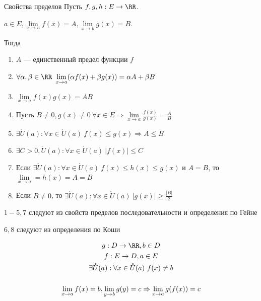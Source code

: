 \begin{thrm}{Свойства пределов}{}
    Пусть \( f, g, h : E \to \RR \).

    \( a \in E, \lim\limits_{x \to a} f(x) = A, \lim\limits_{x \to b} g(x) = B \).

    Тогда
    \begin{enumerate}
        \item
            \( A \) --- единственный предел функции \( f \)
        \item
            \( \forall \alpha, \beta \in \RR \ \lim\limits_{x \to a} (\alpha f(x) + \beta g(x)) = \alpha A + \beta B \)
        \item
            \( \lim\limits_{x \to a} f(x)g(x) = AB \)
        \item
            Пусть 
            \( 
                B \neq 0, g(x) \neq 0 \ \forall x \in E \Rightarrow \lim\limits_{x \to a} \frac{f(x)}{g(x)} = \frac{A}{B} 
            \)
        \item
            \( \exists \mathring{U} (a) : \forall x \in \mathring{U}(a) \ f(x) \leq g(x) \Rightarrow A \leq B \)
        \item
            \( \exists C > 0, \mathring{U}(a) : \forall x \in \mathring{U}(a) \ |f(x)| \leq C \)
        \item
            Если \( \exists \mathring{U}(a) : \forall x \in \mathring{U}(a) \ f(x) \leq h(x) \leq g(x) \)
            и \( A = B \), то \( \lim\limits_{x \to a} = h(x) = A = B \)
        \item
            Если \( B \neq 0 \), то \( \exists \mathring{U}(a) : \forall x \in \mathring{U}(a) \ |g(x)| \geq \frac{|B|}{2} \)
    \end{enumerate}
\end{thrm}

\( 1-5, 7 \) следуют из свойств пределов последовательности и определения по Гейне

\( 6, 8 \) следуют из определения по Коши

\begin{thrm}{}{}
    \begin{gather*}
        g : D \to \RR,  b \in D
        \\
        f : E \to D, a \in E
        \\
        \exists \mathring{U}(a) : \forall x \in \mathring{U}(a) \ f(x) \neq b
        \\
        \\
        \lim\limits_{x \to a} f(x) = b, \lim\limits_{y \to b} g(y) = c \Rightarrow \lim\limits_{x \to a} g(f(x)) = c
    \end{gather*}
\end{thrm}

